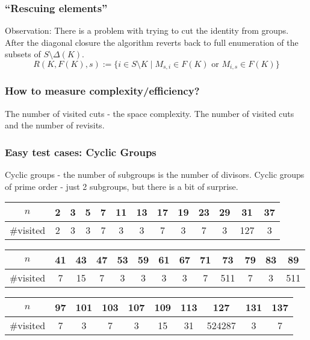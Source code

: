 \documentclass{beamer}
\newcommand{\jump}{\vskip6pt}
\begin{document}
\begin{frame}\frametitle{``Rescuing elements''}
Observation: There is a problem with trying to cut the identity from groups. After the diagonal closure the algorithm reverts back to full enumeration of the subsets of $S\setminus \Delta(K)$.
\jump
$$ R(K,F(K),s):=\{i\in S\setminus K\mid M_{s,i}\in F(K) \text{ or } M_{i,s}\in F(K)\}$$

\end{frame}

\begin{frame}\frametitle{How to measure complexity/efficiency?}
The number of visited cuts - the space complexity.
\jump
The number of visited cuts and the number of revisits.
\end{frame}


\begin{frame}\frametitle{Easy test cases: Cyclic Groups}

Cyclic groups - the number of subgroups is the number of divisors.
\jump
Cyclic groups of prime order - just 2 subgroups, but there is a bit of surprise.
\begin{tabular}{c|c|c|c|c|c|c|c|c|c|c|c|c|}
$n$ & 2 & 3 & 5 & 7 & 11 & 13 & 17 & 19 & 23 & 29 & 31 & 37  \\
\hline
\#visited & 2 & 3&  3& 7& 3& 3& 7& 3& 7& 3& 127 & 3 
\end{tabular}
\jump
\begin{tabular}{c|c|c|c|c|c|c|c|c|c|c|c|c|}
$n$ & 41 & 43 & 47 & 53 & 59 & 61 & 67 & 71 & 73 & 79 & 83 & 89  \\
\hline
\#visited & 7 & 15 &  7& 3& 3& 3& 3& 7& 511& 7& 3 & 511 
\end{tabular}
\jump
\begin{tabular}{c|c|c|c|c|c|c|c|c|c|}
$n$ & 97 & 101 & 103 & 107 & 109 & 113 & 127 & 131 & 137   \\
\hline
\#visited & 7 & 3 &  7& 3& 15 & 31 & 524287 & 3& 7
\end{tabular}


\end{frame}
\end{document}
